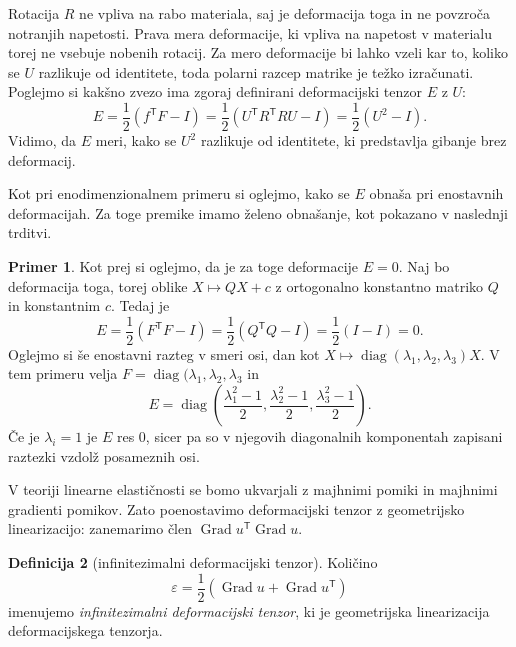 \documentclass[12pt,a4paper]{article}
\theoremstyle{definition} %
\newtheorem{definicija}{Definicija}[section]
\newtheorem{primer}[definicija]{Primer}
\theoremstyle{plain} %
\newtheorem{trditev}[definicija]{Trditev}
\numberwithin{equation}{section}
\newcommand{\T}{\mathsf{T}}
\newcommand{\Grad}{\operatorname{Grad}}
\newcommand{\eps}{\varepsilon}
\newcommand{\vv}{\vec{v}}
\newcommand{\va}{\vec{a}}
\newcommand{\vb}{\vec{b}}
\DeclareMathOperator{\diag}{diag}
\begin{document}
Rotacija $R$ ne vpliva na rabo materiala, saj je deformacija toga in ne povzroča
notranjih napetosti. Prava mera deformacije, ki vpliva na napetost v materialu
torej ne vsebuje nobenih rotacij. Za mero deformacije bi lahko vzeli kar to,
koliko se $U$ razlikuje od identitete, toda polarni razcep matrike je težko
izračunati. Poglejmo si kakšno zvezo ima zgoraj definirani deformacijski tenzor
$E$ z $U$:
\[
  E = \frac12(f^\T F - I) = \frac12(U^\T R^\T R U - I) = \frac12 (U^2 - I).
\]
Vidimo, da $E$ meri, kako se $U^2$ razlikuje od identitete, ki predstavlja
gibanje brez deformacij.

Kot pri enodimenzionalnem primeru si oglejmo, kako se $E$ obnaša pri enostavnih
deformacijah. Za toge premike imamo želeno obnašanje, kot pokazano v naslednji
trditvi.

\begin{primer}
  Kot prej si oglejmo, da je za toge deformacije $E = 0$.
 Naj bo deformacija toga, torej oblike $X \mapsto QX +
c$ z ortogonalno konstantno matriko $Q$ in konstantnim $c$. Tedaj je
\[ E = \frac12 (F^\T F - I) = \frac12(Q^\T Q - I) = \frac12(I - I) = 0. \]
Oglejmo si še enostavni razteg v smeri osi, dan kot
$X \mapsto \diag(\lambda_1, \lambda_2, \lambda_3) X$.
V tem primeru velja $F = \diag(\lambda_1, \lambda_2, \lambda_3$ in
  \[
    E = \diag\left(
      \frac{\lambda_1^2-1}{2},
      \frac{\lambda_2^2-1}{2},
      \frac{\lambda_3^2-1}{2}
    \right).
  \]
  Če je $\lambda_i = 1$ je $E$ res 0, sicer pa so v njegovih diagonalnih
  komponentah zapisani raztezki vzdolž posameznih osi.
\end{primer}

V teoriji linearne elastičnosti se bomo ukvarjali z majhnimi pomiki in majhnimi
gradienti pomikov. Zato poenostavimo deformacijski tenzor z geometrijsko
linearizacijo: zanemarimo člen $\Grad u^\T \Grad u$.

\begin{definicija}[infinitezimalni deformacijski tenzor]
  Količino
  \begin{equation}
    \eps = \frac{1}{2}(\Grad u + \Grad u^\T)
    \label{eq:eps}
  \end{equation}
  imenujemo \emph{infinitezimalni deformacijski tenzor}, ki je geometrijska
  linearizacija deformacijskega tenzorja.
\end{definicija}

\end{document}
